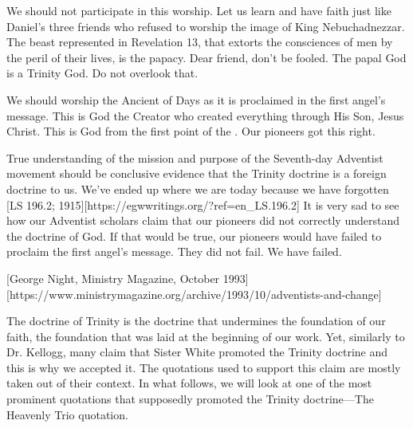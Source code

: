 We should not participate in this worship. Let us learn and have faith just like Daniel’s three friends who refused to worship the image of King Nebuchadnezzar. The beast represented in Revelation 13, that extorts the consciences of men by the peril of their lives, is the papacy. Dear friend, don't be fooled. The papal God is a Trinity God. Do not overlook that. 

We should worship the Ancient of Days as it is proclaimed in the first angel’s message. This is God the Creator who created everything through His Son, Jesus Christ. This is God from the first point of the . Our pioneers got this right. 

True understanding of the mission and purpose of the Seventh-day Adventist movement should be conclusive evidence that the Trinity doctrine is a foreign doctrine to us. We’ve ended up where we are today because we have forgotten [LS 196.2; 1915][https://egwwritings.org/?ref=en\_LS.196.2] It is very sad to see how our Adventist scholars claim that our pioneers did not correctly understand the doctrine of God. If that would be true, our pioneers would have failed to proclaim the first angel’s message. They did not fail. We have failed.

[George Night, Ministry Magazine, October 1993][https://www.ministrymagazine.org/archive/1993/10/adventists-and-change]

The doctrine of Trinity is the doctrine that undermines the foundation of our faith, the foundation that was laid at the beginning of our work. Yet, similarly to Dr. Kellogg, many claim that Sister White promoted the Trinity doctrine and this is why we accepted it. The quotations used to support this claim are mostly taken out of their context. In what follows, we will look at one of the most prominent quotations that supposedly promoted the Trinity doctrine—The Heavenly Trio quotation.
